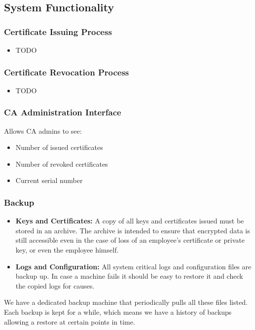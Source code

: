 \documentclass[english]{article}
\begin{document}
\subsection{System Functionality}


\subsubsection{Certificate Issuing Process}
\begin{itemize}
\item TODO
\end{itemize}

\subsubsection{Certificate Revocation Process}
\begin{itemize}
\item TODO
\end{itemize}

\subsubsection{CA Administration Interface}
Allows CA admins to see:
\begin{itemize}
\item Number of issued certificates
\item Number of revoked certificates
\item Current serial number
\end{itemize}

\subsubsection{Backup}
\begin{itemize}
\item \textbf{Keys and Certificates:} A copy of all keys and certificates issued must be stored in an archive. The archive is intended to ensure that encrypted data is still accessible even in the
case of loss of an employee’s certificate or private key, or even the employee
himself.
\item \textbf{Logs and Configuration:} All system critical logs and configuration files are backup up. In case a machine fails it should be easy to restore it and check the copied logs for causes.
\end{itemize}

We have a dedicated backup machine that periodically pulls all these files listed. Each backup is kept for a while, which means we have a history of backups allowing a restore at certain points in time. 
\end{document}
